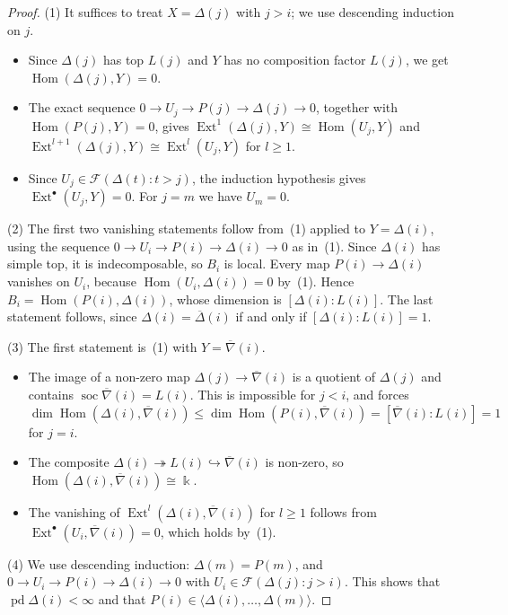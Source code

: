 \documentclass[11pt,reqno]{amsart}
\theoremstyle{plain}
\theoremstyle{definition}
\theoremstyle{remark}
\newcommand{\kk}{\Bbbk}
\DeclareMathOperator{\Hom}{Hom}
\DeclareMathOperator{\Ext}{Ext}
\DeclareMathOperator{\pd}{pd}
\DeclareMathOperator{\soc}{soc}
\newcommand{\thick}[1]{\langle #1\rangle}
\newcommand{\nablabar}{\overline{\nabla}}
\newcommand{\Deltabar}{\overline{\Delta}}
\newcommand{\cF}{\mathcal{F}}
\begin{document}
\begin{proof}
(1) It suffices to treat $X=\Delta(j)$ with $j>i$; we use descending induction on $j$.
\begin{itemize}
\item Since $\Delta(j)$ has top $L(j)$ and $Y$ has no composition factor $L(j)$, we get $\Hom(\Delta(j),Y)=0$.
\item The exact sequence $0\to U_j\to P(j)\to\Delta(j)\to0$, together with $\Hom(P(j),Y)=0$, gives $\Ext^1(\Delta(j),Y)\cong\Hom(U_j,Y)$ and $\Ext^{l+1}(\Delta(j),Y)\cong\Ext^l(U_j,Y)$ for $l\ge1$.
\item Since $U_j\in\cF(\Delta(t):t>j)$, the induction hypothesis gives $\Ext^\bullet(U_j,Y)=0$. For $j=m$ we have $U_m=0$.
\end{itemize}

(2) The first two vanishing statements follow from~(1) applied to $Y=\Delta(i)$, using the sequence $0\to U_i\to P(i)\to\Delta(i)\to0$ as in~(1). Since $\Delta(i)$ has simple top, it is indecomposable, so $B_i$ is local. Every map $P(i)\to\Delta(i)$ vanishes on $U_i$, because $\Hom(U_i,\Delta(i))=0$ by~(1). Hence $B_i=\Hom(P(i),\Delta(i))$, whose dimension is $[\Delta(i):L(i)]$. The last statement follows, since $\Delta(i)=\Deltabar(i)$ if and only if $[\Delta(i):L(i)]=1$.

(3) The first statement is~(1) with $Y=\nablabar(i)$.
\begin{itemize}
\item The image of a non-zero map $\Delta(j)\to\nablabar(i)$ is a quotient of $\Delta(j)$ and contains $\soc\nablabar(i)=L(i)$. This is impossible for $j<i$, and forces $\dim\Hom(\Delta(i),\nablabar(i))\le\dim\Hom(P(i),\nablabar(i))=[\nablabar(i):L(i)]=1$ for $j=i$.
\item The composite $\Delta(i)\twoheadrightarrow L(i)\hookrightarrow\nablabar(i)$ is non-zero, so $\Hom(\Delta(i),\nablabar(i))\cong\kk$.
\item The vanishing of $\Ext^{l}(\Delta(i),\nablabar(i))$ for $l\ge1$ follows from $\Ext^\bullet(U_i,\nablabar(i))=0$, which holds by~(1).
\end{itemize}

(4) We use descending induction: $\Delta(m)=P(m)$, and $0\to U_i\to P(i)\to\Delta(i)\to0$ with $U_i\in\cF(\Delta(j):j>i)$. This shows that $\pd\Delta(i)<\infty$ and that $P(i)\in\thick{\Delta(i),\dots,\Delta(m)}$.
\end{proof}
\end{document}
